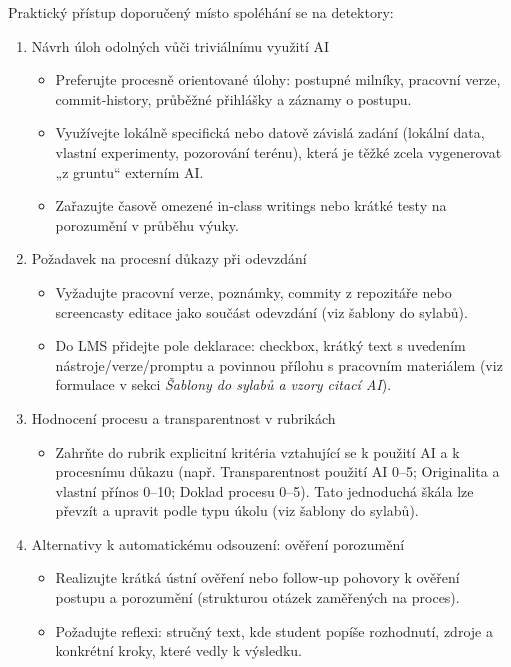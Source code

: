 \documentclass{report}%
\begin{document}
\noindent
Praktický přístup doporučený místo spoléhání se na detektory:
\begin{enumerate}
  \item Návrh úloh odolných vůči triviálnímu využití AI
    \begin{itemize}
      \item Preferujte procesně orientované úlohy: postupné milníky, pracovní verze, commit‑history, průběžné přihlášky a záznamy o postupu.
      \item Využívejte lokálně specifická nebo datově závislá zadání (lokální data, vlastní experimenty, pozorování terénu), která je těžké zcela vygenerovat „z gruntu“ externím AI.
      \item Zařazujte časově omezené in‑class writings nebo krátké testy na porozumění v průběhu výuky.
    \end{itemize}

  \item Požadavek na procesní důkazy při odevzdání
    \begin{itemize}
      \item Vyžadujte pracovní verze, poznámky, commity z repozitáře nebo screencasty editace jako součást odevzdání (viz šablony do sylabů).
      \item Do LMS přidejte pole deklarace: checkbox, krátký text s uvedením nástroje/verze/promptu a povinnou přílohu s pracovním materiálem (viz formulace v sekci \emph{Šablony do sylabů a vzory citací AI}).
    \end{itemize}

  \item Hodnocení procesu a transparentnost v rubrikách
    \begin{itemize}
      \item Zahrňte do rubrik explicitní kritéria vztahující se k použití AI a k procesnímu důkazu (např. Transparentnost použití AI 0–5; Originalita a vlastní přínos 0–10; Doklad procesu 0–5). Tato jednoduchá škála lze převzít a upravit podle typu úkolu (viz šablony do sylabů).
    \end{itemize}

  \item Alternativy k automatickému odsouzení: ověření porozumění
    \begin{itemize}
      \item Realizujte krátká ústní ověření nebo follow‑up pohovory k ověření postupu a porozumění (strukturou otázek zaměřených na proces).
      \item Požadujte reflexi: stručný text, kde student popíše rozhodnutí, zdroje a konkrétní kroky, které vedly k výsledku.
    \end{itemize}


\end{enumerate}
\end{document}
